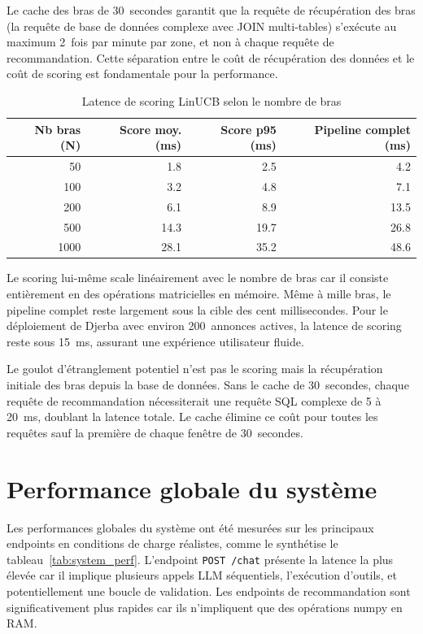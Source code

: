 Le cache des bras de 30~secondes garantit que la requête de récupération des bras (la requête
de base de données complexe avec JOIN multi-tables) s'exécute au maximum 2~fois par minute
par zone, et non à chaque requête de recommandation. Cette séparation entre le coût de
récupération des données et le coût de scoring est fondamentale pour la performance.

\begin{table}[H]
    \centering
    \caption{Latence de scoring LinUCB selon le nombre de bras}
    \label{tab:scoring_latency}
    \small
    \begin{tabular}{r r r r}
        \toprule
        \textbf{Nb bras (N)} & \textbf{Score moy. (ms)} &
        \textbf{Score p95 (ms)} & \textbf{Pipeline complet (ms)} \\
        \midrule
        50 & 1.8 & 2.5 & 4.2 \\
        100 & 3.2 & 4.8 & 7.1 \\
        200 & 6.1 & 8.9 & 13.5 \\
        500 & 14.3 & 19.7 & 26.8 \\
        1000 & 28.1 & 35.2 & 48.6 \\
        \bottomrule
    \end{tabular}
\end{table}

Le scoring lui-même scale linéairement avec le nombre de bras car il consiste entièrement
en des opérations matricielles en mémoire. Même à mille bras, le pipeline complet
reste largement sous la cible des cent millisecondes. Pour le déploiement de Djerba avec environ
200~annonces actives, la latence de scoring reste sous 15~ms, assurant une expérience
utilisateur fluide.

Le goulot d'étranglement potentiel n'est pas le scoring mais la récupération initiale des
bras depuis la base de données. Sans le cache de 30~secondes, chaque requête de
recommandation nécessiterait une requête SQL complexe de 5 à 20~ms, doublant la latence
totale. Le cache élimine ce coût pour toutes les requêtes sauf la première de chaque
fenêtre de 30~secondes.


\section{Performance globale du système}

Les performances globales du système ont été mesurées sur les principaux endpoints en
conditions de charge réalistes, comme le synthétise le tableau~\ref{tab:system_perf}. L'endpoint \texttt{POST /chat} présente la latence la
plus élevée car il implique plusieurs appels LLM séquentiels, l'exécution d'outils, et
potentiellement une boucle de validation. Les endpoints de recommandation sont
significativement plus rapides car ils n'impliquent que des opérations numpy en RAM.

